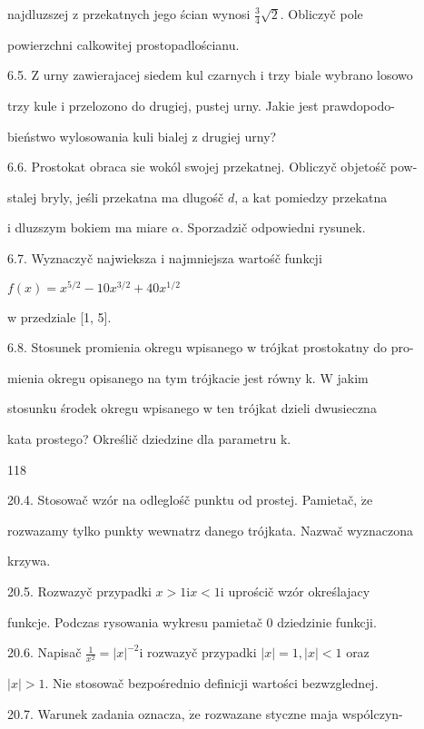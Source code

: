 \documentclass[a4paper,12pt]{article}
\begin{document}
najdluzszej $\mathrm{z}$ przekatnych jego ścian wynosi $\displaystyle \frac{3}{4}\sqrt{2}$. Obliczyč pole

powierzchni calkowitej prostopadlościanu.

6.5. $\mathrm{Z}$ urny zawierajacej siedem kul czarnych $\mathrm{i}$ trzy biale wybrano losowo

trzy kule $\mathrm{i}$ przelozono do drugiej, pustej urny. Jakie jest prawdopodo-

bieństwo wylosowania kuli bialej $\mathrm{z}$ drugiej urny?

6.6. Prostokat obraca $\mathrm{s}\mathrm{i}\mathrm{e}$ wokól swojej przekatnej. Obliczyč objetośč pow-

stalej bryly, jeśli przekatna ma dlugośč $d$, a $\mathrm{k}\mathrm{a}\mathrm{t}$ pomiedzy przekatna

$\mathrm{i}$ dluzszym bokiem ma miare $\alpha$. Sporzadzič odpowiedni rysunek.

6.7. Wyznaczyč najwieksza $\mathrm{i}$ najmniejsza wartośč funkcji

$f(x)=x^{5/2}-10x^{3/2}+40x^{1/2}$

w przedziale [1, 5].

6.8. Stosunek promienia okregu wpisanego w trójkat prostokatny do pro-

mienia okregu opisanego na tym trójkacie jest równy k. W jakim

stosunku środek okregu wpisanego w ten trójkat dzieli dwusieczna

kata prostego? Określič dziedzine dla parametru k.





118

20.4. Stosowač wzór na odleglośč punktu od prostej. Pamietač, $\dot{\mathrm{z}}\mathrm{e}$

rozwazamy tylko punkty wewnatrz danego trójkata. Nazwač wyznaczona

krzywa.

20.5. Rozwazyč przypadki $x > 1 \mathrm{i}x < 1 \mathrm{i}$ uprościč wzór określajacy

funkcje. Podczas rysowania wykresu pamietač $0$ dziedzinie funkcji.

20.6. Napisač $\displaystyle \frac{1}{x^{2}} = |x|^{-2}\mathrm{i}$ rozwazyč przypadki $|x| =1, |x| < 1$ oraz

$|x|>1$. Nie stosowač bezpośrednio definicji wartości bezwzglednej.

20.7. Warunek zadania oznacza, $\dot{\mathrm{z}}\mathrm{e}$ rozwazane styczne maja wspólczyn-
\end{document}
